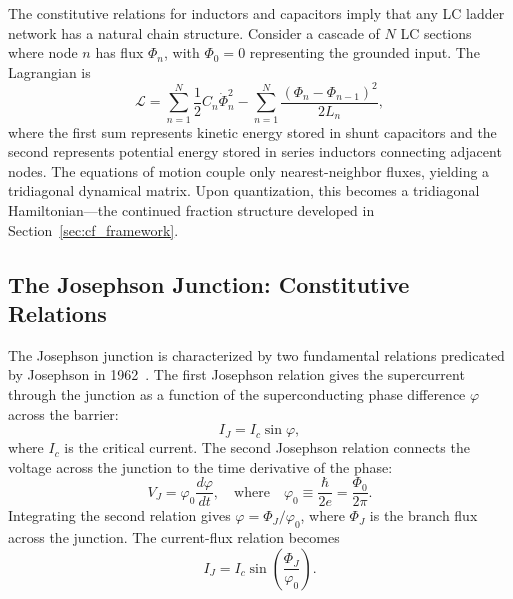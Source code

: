 \documentclass[reprint, floatfix, superscriptaddress, amsmath, amssymb, longbibliography]{revtex4-2}
\begin{document}
The constitutive relations for inductors and capacitors imply that any LC ladder network has a natural chain structure. Consider a cascade of $N$ LC sections where node $n$ has flux $\Phi_n$, with $\Phi_0 = 0$ representing the grounded input. The Lagrangian is
\begin{equation}
\mathcal{L} = \sum_{n=1}^{N} \frac{1}{2}C_n \dot{\Phi}_n^2 - \sum_{n=1}^{N} \frac{(\Phi_n - \Phi_{n-1})^2}{2L_n},
\label{eq:lc_chain_lagrangian}
\end{equation}
where the first sum represents kinetic energy stored in shunt capacitors and the second represents potential energy stored in series inductors connecting adjacent nodes. The equations of motion couple only nearest-neighbor fluxes, yielding a tridiagonal dynamical matrix. Upon quantization, this becomes a tridiagonal Hamiltonian---the continued fraction structure developed in Section~\ref{sec:cf_framework}.

\subsection{The Josephson Junction: Constitutive Relations}
\label{sec:josephson}

The Josephson junction is characterized by two fundamental relations predicated by Josephson in 1962~\cite{Josephson1962}. The first Josephson relation gives the supercurrent through the junction as a function of the superconducting phase difference $\varphi$ across the barrier:
\begin{equation}
I_J = I_c \sin\varphi,
\label{eq:josephson_1}
\end{equation}
where $I_c$ is the critical current. The second Josephson relation connects the voltage across the junction to the time derivative of the phase:
\begin{equation}
V_J = \varphi_0 \frac{d\varphi}{dt}, \quad \text{where} \quad \varphi_0 \equiv \frac{\hbar}{2e} = \frac{\Phi_0}{2\pi}.
\label{eq:josephson_2}
\end{equation}
Integrating the second relation gives $\varphi = \Phi_J/\varphi_0$, where $\Phi_J$ is the branch flux across the junction. The current-flux relation becomes
\begin{equation}
I_J = I_c \sin\left(\frac{\Phi_J}{\varphi_0}\right).
\label{eq:josephson_current_flux}
\end{equation}
\end{document}
